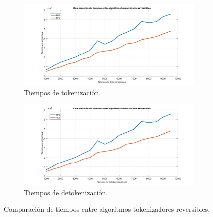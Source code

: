 \begin{figure}
  \centering
  \begin{subfigure}{1\textwidth}
    \begin{center}
      \includegraphics[width=1\linewidth]
        {../../../../../diagramas_comunes/desempenio/tok_rev}
      \caption{Tiempos de tokenización.}
    \end{center}
  \end{subfigure}
  \begin{subfigure}{0.9\textwidth}
    \begin{center}
      \includegraphics[width=1\linewidth]{diagramas/detok_rev}
      \caption{Tiempos de detokenización.}
    \end{center}
  \end{subfigure}
  \caption{Comparación de tiempos entre algoritmos tokenizadores reversibles.}
  \label{figura:tok_rev}
\end{figure}


